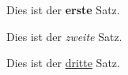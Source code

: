 \documentclass[12pt,a4paper,final]{scrbook}
\begin{document}
Dies ist der \textbf{erste} {\Huge Satz}. 

Dies ist der \textit{zweite} Satz. 

Dies ist der \underline{dritte} {\tiny Satz}. 


\end{document}
